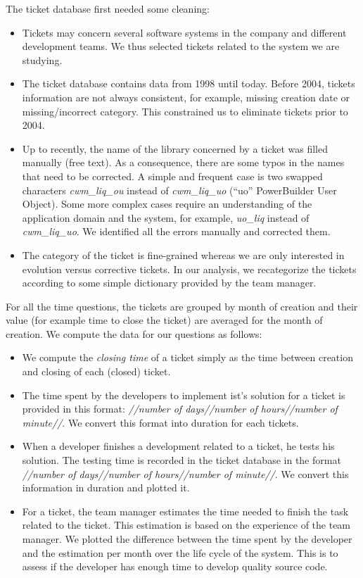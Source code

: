 \documentclass[10pt,conference]{IEEEtran}
\begin{document}
The ticket database first needed some cleaning:
\begin{itemize}
  \item Tickets may concern several software systems in the company and different development teams.
  We thus selected tickets related to the system we are studying.
  
  \item The ticket database contains data from 1998  until today. 
  Before 2004, tickets information are not always consistent, for example, missing creation date or missing/incorrect category.
  This constrained us to eliminate tickets prior to 2004.

  \item Up to recently, the name of the library concerned by a ticket was filled manually (free text).
  As a consequence, there are some typos in the names that need to be corrected.
  A simple and frequent case is two swapped characters \emph{cwm\_liq\_ou} instead of \emph{cwm\_liq\_uo} (``uo'' PowerBuilder User Object).
  Some more complex cases require an understanding of the application domain and the system, for example, \emph{uo\_liq} instead of \emph{cwm\_liq\_uo}.
  We identified all the errors manually and corrected them.
  
  \item The category of the ticket is fine-grained whereas we are only interested in evolution versus corrective tickets.
  In our analysis, we recategorize the tickets according to some simple dictionary provided by the team manager.
  
\end{itemize}
 
For all the time questions, the tickets are grouped by month of creation and their value (for example time to close the ticket) are averaged for the month of creation.  
We compute the data for our questions as follows:
\begin{itemize}
  \item We compute the \emph{closing time} of a ticket simply as the time between creation and closing of each (closed) ticket.
\item  The time spent by the developers to implement ist's solution for a ticket is provided in this format: \emph{//number of days//number of hours//number of minute//}.
 We convert this format into duration for each tickets. 
 \item When a developer finishes a development related to a ticket, he tests his solution.  
 The testing time is recorded in the ticket database in the format \emph{//number of days//number of hours//number of minute//}.
  We convert this information in duration and plotted it.
 \item For a ticket, the team manager estimates the time needed to finish the task related to the ticket.
 This estimation is based on the experience of the team manager.  
 We plotted the difference  between the time spent by the developer and the estimation per month over the life cycle of the system.  
 This is to assess if the developer has enough time to develop quality source code.
\end{itemize}
\end{document}
